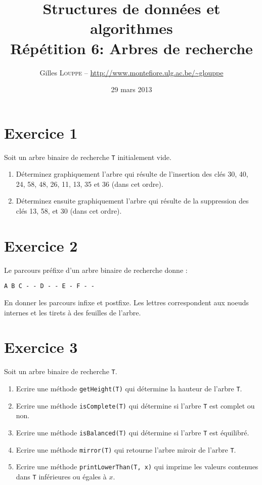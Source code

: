 \documentclass[a4paper,10pt]{article}
\title{
    \textbf{Structures de données et algorithmes}\\
    Répétition 6: Arbres de recherche
}
\author{Gilles \textsc{Louppe} -- \url{http://www.montefiore.ulg.ac.be/~glouppe}}
\date{29 mars 2013}
\begin{document}
\maketitle

\section*{Exercice 1}

Soit un arbre binaire de recherche \texttt{T} initialement vide.

\begin{enumerate}

\item Déterminez graphiquement l'arbre qui résulte de l'insertion des clés 30, 40, 24, 58, 48, 26, 11, 13, 35 et 36 (dans cet ordre).

\item Déterminez ensuite graphiquement l'arbre qui résulte de la suppression des clés 13, 58, et 30 (dans cet ordre).

\end{enumerate}

\section*{Exercice 2}

Le parcours préfixe d'un arbre binaire de recherche donne :
\begin{verbatim}
A B C - - D - - E - F - -
\end{verbatim}

En donner les parcours infixe et postfixe. Les lettres correspondent aux
noeuds internes et les tirets à des feuilles de l'arbre.

\section*{Exercice 3}

Soit un arbre binaire de recherche \texttt{T}.

\begin{enumerate}

\item Ecrire une méthode \texttt{getHeight(T)} qui détermine la hauteur de l'arbre \texttt{T}.
\item Ecrire une méthode \texttt{isComplete(T)} qui détermine si l'arbre \texttt{T} est complet ou non.
\item Ecrire une méthode \texttt{isBalanced(T)} qui détermine si l'arbre \texttt{T} est équilibré.
\item Ecrire une méthode \texttt{mirror(T)} qui retourne l'arbre miroir de l'arbre \texttt{T}.
\item Ecrire une méthode \texttt{printLowerThan(T, x)} qui imprime les valeurs contenues dans \texttt{T} inférieures ou égales à $x$.

\end{enumerate}
\end{document}
